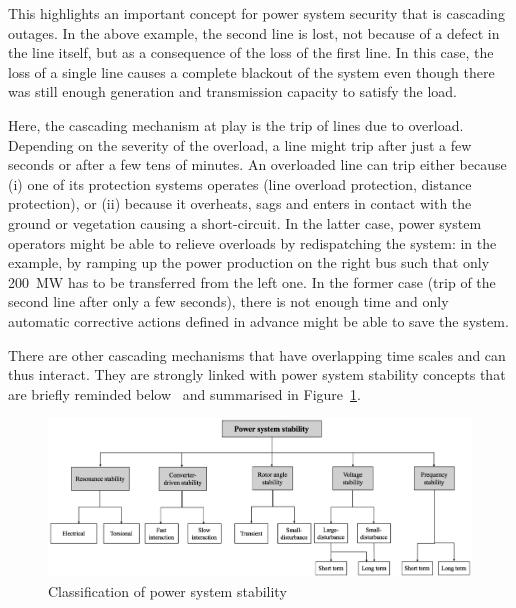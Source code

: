 This highlights an important concept for power system security that is cascading outages. In the above example, the second line is lost, not because of a defect in the line itself, but as a consequence of the loss of the first line. In this case, the loss of a single line causes a complete blackout of the system even though there was still enough generation and transmission capacity to satisfy the load.

Here, the cascading mechanism at play is the trip of lines due to overload. Depending on the severity of the overload, a line might trip after just a few seconds or after a few tens of minutes. An overloaded line can trip either because (i) one of its protection systems operates (\eg line overload protection, distance protection), or (ii) because it overheats, sags and enters in contact with the ground or vegetation causing a short-circuit. In the latter case, power system operators might be able to relieve overloads by redispatching the system: in the example, by ramping up the power production on the right bus such that only 200~MW has to be transferred from the left one. In the former case (trip of the second line after only a few seconds), there is not enough time and only automatic corrective actions defined in advance might be able to save the system.

There are other cascading mechanisms that have overlapping time scales and can thus interact. They are strongly linked with power system stability concepts that are briefly reminded below~\cite{StabilityDefinition, StabilityDefinitionRevised} and summarised in Figure~\ref{fig:stability_classification}.

\begin{figure}
    \centering
    \includegraphics[width=\linewidth]{Figs/StabilityClassification.png}
    \caption{Classification of power system stability~\cite{StabilityDefinitionRevised}}
    \label{fig:stability_classification}
\end{figure}

